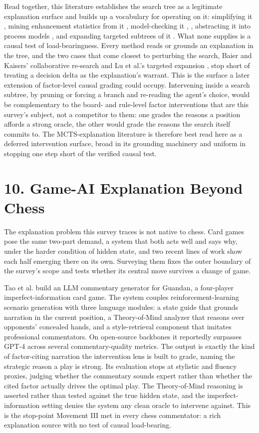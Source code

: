 \documentclass[conference]{IEEEtran}
\begin{document}
Read together, this literature establishes the search tree as a legitimate explanation surface and builds up a vocabulary for operating on it: simplifying it \cite{ref55}, mining enhancement statistics from it \cite{ref34}, model-checking it \cite{ref36}, \cite{ref37}, abstracting it into process models \cite{ref38}, and expanding targeted subtrees of it \cite{ref35}. What none supplies is a causal test of load-bearingness. Every method reads or grounds an explanation in the tree, and the two cases that come closest to perturbing the search, Baier and Kaisers' collaborative re-search \cite{ref55} and Lu et al.'s targeted expansion \cite{ref35}, stop short of treating a decision delta as the explanation's warrant. This is the surface a later extension of factor-level causal grading could occupy. Intervening inside a search subtree, by pruning or forcing a branch and re-reading the agent's choice, would be complementary to the board- and rule-level factor interventions that are this survey's subject, not a competitor to them: one grades the reasons a position affords a strong oracle, the other would grade the reasons the search itself commits to. The MCTS-explanation literature is therefore best read here as a deferred intervention surface, broad in its grounding machinery and uniform in stopping one step short of the verified causal test.

\section*{10. Game-AI Explanation Beyond Chess}
The explanation problem this survey traces is not native to chess. Card games pose the same two-part demand, a system that both acts well and says why, under the harder condition of hidden state, and two recent lines of work show each half emerging there on its own. Surveying them fixes the outer boundary of the survey's scope and tests whether its central move survives a change of game.

Tao et al. \cite{ref57} build an LLM commentary generator for Guandan, a four-player imperfect-information card game. The system couples reinforcement-learning scenario generation with three language modules: a state guide that grounds narration in the current position, a Theory-of-Mind analyzer that reasons over opponents' concealed hands, and a style-retrieval component that imitates professional commentators. On open-source backbones it reportedly surpasses GPT-4 across several commentary-quality metrics. The output is exactly the kind of factor-citing narration the intervention lens is built to grade, naming the strategic reason a play is strong. Its evaluation stops at stylistic and fluency proxies, judging whether the commentary sounds expert rather than whether the cited factor actually drives the optimal play. The Theory-of-Mind reasoning is asserted rather than tested against the true hidden state, and the imperfect-information setting denies the system any clean oracle to intervene against. This is the stop-point Movement III met in every chess commentator: a rich explanation source with no test of causal load-bearing.
\end{document}
